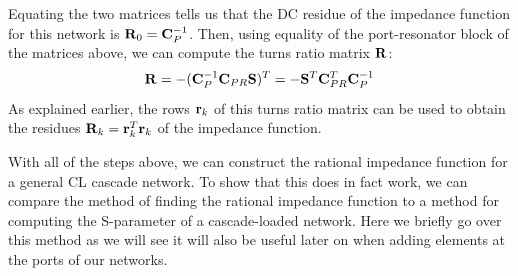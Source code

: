 \begin{framed}
\begin{enumerate}
\begin{equation}
    \end{equation}
    Equating the two matrices tells us that the DC residue of the impedance function for this network is $\vb{R}_0 = \vb{C}_P^{-1}$. Then, using equality of the port-resonator block of the matrices above, we can compute the turns ratio matrix $\vb{R}$:
    \begin{equation}
        \vb{R} = -(\vb{C}_P^{-1} \vb{C}_{PR} \vb{S})^T = -\vb{S}^T \vb{C}_{PR}^T \vb{C}_P^{-1}
    \end{equation}
    As explained earlier, the rows $\vb{r}_k$ of this turns ratio matrix can be used to obtain the residues $\vb{R}_k = \vb{r}_k^T \vb{r}_k$ of the impedance function.
\end{enumerate}
\end{framed}
\newpage
With all of the steps above, we can construct the rational impedance function for a general CL cascade network. To show that this does in fact work, we can compare the method of finding the rational impedance function to a method for computing the S-parameter of a cascade-loaded network. Here we briefly go over this method as we will see it will also be useful later on when adding elements at the ports of our networks.

